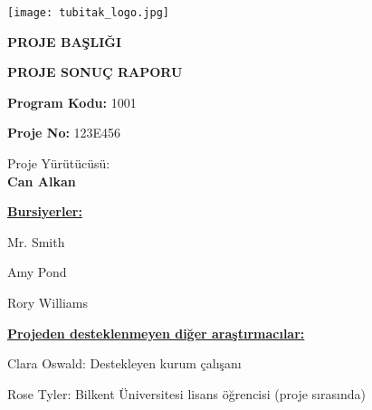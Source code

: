 \documentclass[11pt]{article}
\begin{document}
\pagestyle{fancy}
   \lhead{}\rhead{}
   \lfoot{\textcolor{light-gray}{\small Proje Sonuç Raporu}}
        \cfoot{{\thepage}}
        \rfoot{}
  \renewcommand{\headrulewidth}{0pt}

\renewcommand{\figurename}{\bf Şekil}
\renewcommand{\tablename}{\bf Tablo}
\renewcommand{\contentsname}{İçindekiler}
\renewcommand{\refname}{Referanslar}
\renewcommand{\listfigurename}{Şekiller}
\renewcommand{\listtablename}{Tablolar}


\newpage
\phantom{22}
\vspace{-3cm}

\begin{center}
\texttt{[image: tubitak\_logo.jpg]}

\bigskip
\bigskip


\bigskip
{\fontsize{15}{10}\selectfont 
\bigskip


\bigskip
\medskip
{ \textbf{\Huge PROJE BAŞLIĞI \\}}}


\bigskip
\medskip
{ \textbf{ PROJE SONUÇ RAPORU}}
\bigskip



\end{center}


\bigskip

\bigskip


\thispagestyle{empty}


\begin{center}
\medskip
{\LARGE \textbf{Program Kodu:} 1001}

\bigskip
{\LARGE \textbf{Proje No:} 123E456}

\bigskip
{\LARGE Proje Yürütücüsü:\\
\textbf{Can Alkan}}

\end{center}

\bigskip


\bigskip
\noindent
{\large
\noindent
\underline{\bf Bursiyerler:}

\noindent
Mr. Smith

\noindent
Amy Pond

\noindent
Rory Williams

\noindent \underline{\bf Projeden desteklenmeyen diğer araştırmacılar:}

\noindent
Clara Oswald:  Destekleyen kurum çalışanı

\noindent
Rose Tyler: Bilkent Üniversitesi lisans öğrencisi (proje sırasında)


}
\end{document}
